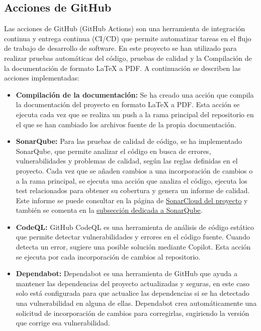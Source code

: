 \subsection{Acciones de GitHub}
\label{subsec:acciones}
Las acciones de GitHub (GitHub Actions) son una herramienta de integración continua y entrega continua (CI/CD) que permite automatizar tareas en el flujo de trabajo de desarrollo de software. En este proyecto se han utilizado para realizar pruebas automáticas del código, pruebas de calidad y la Compilación de la documentación de formato LaTeX a PDF. A continuación se describen las acciones implementadas:
\begin{itemize}
    \item \textbf{Compilación de la documentación:} Se ha creado una acción que compila la documentación del proyecto en formato LaTeX a PDF. Esta acción se ejecuta cada vez que se realiza un push a la rama principal del repositorio en el que se han cambiado los archivos fuente de la propia documentación.
    \item \textbf{SonarQube:} Para las pruebas de calidad de código, se ha implementado SonarQube, que permite analizar el código en busca de errores, vulnerabilidades y problemas de calidad, según las reglas definidas en el proyecto. Cada vez que se añaden cambios a una incorporación de cambios o a la rama principal, se ejecuta una acción que analiza el código, ejecuta los test relacionados para obtener su cobertura y genera un informe de calidad. Este informe se puede consultar en la página de \href{https://sonarcloud.io/project/overview?id=CesarRodrigu_GII-24.19-contramedidas-IoT-mediante-reinforcement-learning}{SonarCloud del proyecto} y también se comenta en la \hyperref[subsec:sonarqube]{subsección dedicada a SonarQube}.

    \item \textbf{CodeQL:} GitHub CodeQL es una herramienta de análisis de código estático que permite detectar vulnerabilidades y errores en el código fuente. Cuando detecta un error, sugiere una posible solución mediante Copilot. Esta acción se ejecuta por cada incorporación de cambios al repositorio.
    \item \textbf{Dependabot:} Dependabot es una herramienta de GitHub que ayuda a mantener las dependencias del proyecto actualizadas y seguras, en este caso solo está configurada para que actualice las dependencias si se ha detectado una vulnerabilidad en alguna de ellas. Dependabot crea automáticamente una solicitud de incorporación de cambios para corregirlas, sugiriendo la versión que corrige esa vulnerabilidad.
\end{itemize}


